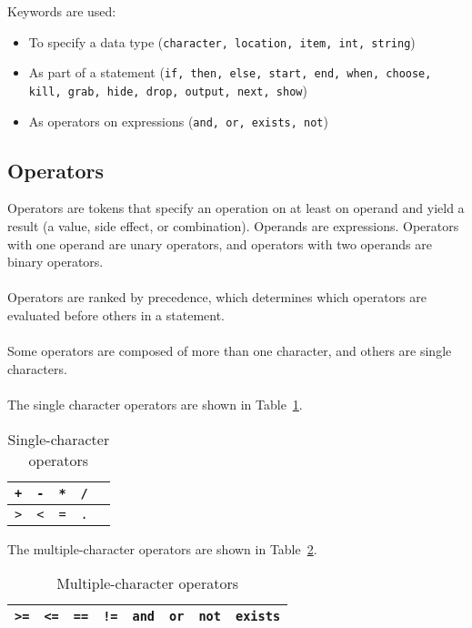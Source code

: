\documentclass[12pt]{article}
\begin{document}
\noindent Keywords are used:
\begin{itemize}
\item To specify a data type (\texttt{character, location, item, int, string})
\item As part of a statement (\texttt{if, then, else, start, end, when, choose, kill, grab, hide, drop, output, next, show}) 
\item As operators on expressions (\texttt{and, or, exists, not})
\end{itemize}

\subsection{Operators}
Operators are tokens that specify an operation on at least on operand and yield a result (a value, side effect, or combination).  Operands are expressions.  Operators with one operand are unary operators, and operators with two operands are binary operators.
\\
\\
\noindent Operators are ranked by precedence, which determines which operators are evaluated before others in a statement.
\\
\\
\noindent Some operators are composed of more than one character, and others are single characters.
\\
\\
\noindent The single character operators are shown in Table~\ref{single_operators}.

\begin{table}[htdp]
\caption{Single-character operators}
\begin{center}
\begin{tabular}{|c|c|c|c|c|}
\hline
\texttt{+} & \texttt{-} & \texttt{*} & \texttt{/}  \\
\hline
\texttt{>} & \texttt{<} & \texttt{=} & \texttt{.}  \\
\hline
\end{tabular}
\end{center}
\label{single_operators}
\end{table}%


\noindent The multiple-character operators are shown in Table~\ref{multi_operators}.

\begin{table}[htdp]
\caption{Multiple-character operators}
\begin{center}
\begin{tabular}{|c|c|c|c|c|c|c|c|}
\hline
\texttt{>=} & \texttt{<=} & \texttt{==} & \texttt{!=} & \texttt{and} & \texttt{or} & \texttt{not} & \texttt{exists}\\
\hline
\end{tabular}
\end{center}
\label{multi_operators}
\end{table}%
\end{document}
